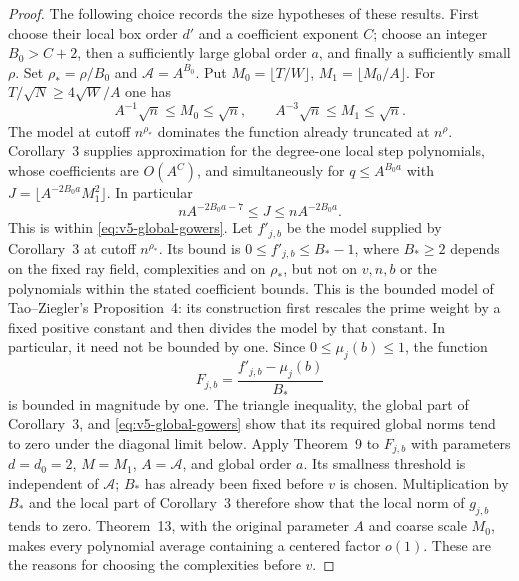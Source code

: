 \documentclass[11pt]{article}
\theoremstyle{definition}
\theoremstyle{remark}
\begin{document}
\begin{proof}
The following choice records the size hypotheses of these results.
First choose their local box order $d'$ and a coefficient exponent $C$;
choose an integer $B_0>C+2$, then a sufficiently large global order $a$,
and finally a sufficiently small $\rho$. Set $\rho_* =\rho/B_0$ and
$\mathcal A=A^{B_0}$. Put
$M_0=\lfloor T/W\rfloor$, $M_1=\lfloor M_0/A\rfloor$.
For $T/\sqrt N\geq4\sqrt W/A$ one has
\[
 A^{-1}\sqrt n\leq M_0\leq\sqrt n,
 \qquad A^{-3}\sqrt n\leq M_1\leq\sqrt n.
\]
The model at cutoff $n^{\rho_*}$ dominates the function already truncated
at $n^\rho$. Corollary~3 supplies approximation for the degree-one local
step polynomials, whose coefficients are $O(A^C)$, and simultaneously for
$q\leq A^{B_0a}$ with
$J=\lfloor A^{-2B_0a}M_1^2\rfloor$.
In particular
\[
 nA^{-2B_0a-7}\leq J\leq nA^{-2B_0a}.
\]
This is within \eqref{eq:v5-global-gowers}. Let $f'_{j,b}$ be the
model supplied by Corollary~3 at cutoff $n^{\rho_*}$. Its bound is
$0\leq f'_{j,b}\leq B_*-1$, where $B_*\geq2$ depends on the fixed
ray field, complexities and on $\rho_*$, but not on $v,n,b$ or the polynomials
within the stated coefficient bounds. This is the bounded model of
Tao--Ziegler's Proposition~4: its construction first rescales the
prime weight by a fixed positive constant and then divides the model
by that constant. In particular, it need not be bounded by one.
Since $0\leq\mu_j(b)\leq1$, the function
\[
 F_{j,b}=\frac{f'_{j,b}-\mu_j(b)}{B_*}
\]
is bounded in magnitude by one. The triangle inequality, the global
part of Corollary~3, and \eqref{eq:v5-global-gowers} show that its
required global norms tend to zero under the diagonal limit below.
Apply Theorem~9 to $F_{j,b}$
with parameters $d=d_0=2$, $M=M_1$, $A=\mathcal A$, and global
order $a$. Its smallness threshold is independent of $\mathcal A$;
$B_*$ has already been fixed before $v$ is chosen. Multiplication
by $B_*$ and the local part of Corollary~3 therefore show that the
local norm of $g_{j,b}$ tends to zero. Theorem~13, with the original
parameter $A$ and coarse scale $M_0$, makes every polynomial average
containing a centered factor $o(1)$. These are the reasons for choosing
the complexities before $v$.


\end{proof}
\end{document}
